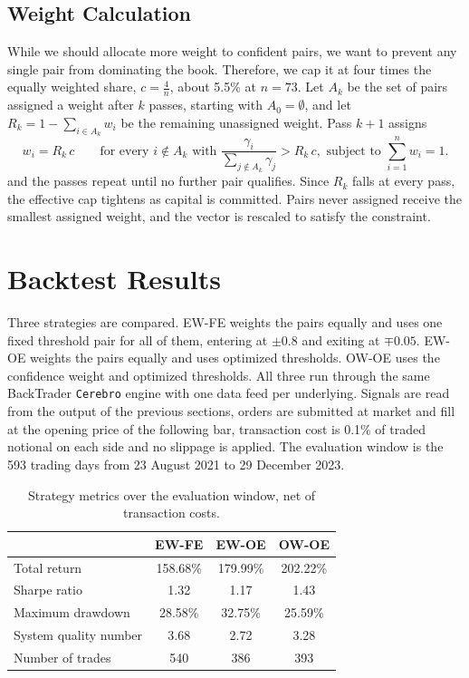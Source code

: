 \documentclass[11pt]{article}
\newcommand{\EWFE}{\mbox{EW-FE}}
\newcommand{\EWOE}{\mbox{EW-OE}}
\newcommand{\OWOE}{\mbox{OW-OE}}
\begin{document}
\subsection{Weight Calculation}

While we should allocate more weight to confident pairs, we want to prevent any single pair from dominating the book. Therefore, we cap it at four times the equally weighted share, $c = \frac{4}{n}$, about 5.5\% at $n = 73$. Let $A_k$ be the set of pairs assigned a weight after $k$ passes, starting with $A_0 = \emptyset$, and let $R_k = 1 - \sum_{i \in A_k} w_i$ be the remaining unassigned weight. Pass $k+1$ assigns
\begin{equation}
w_i = R_k\, c \qquad \text{for every } i \notin A_k \text{ with } \frac{\gamma_i}{\sum_{j \notin A_k} \gamma_j} > R_k\, c, \text{ subject to }
\sum_{i=1}^{n} w_i = 1 .
\label{eq:cap}
\end{equation}
and the passes repeat until no further pair qualifies. Since $R_k$ falls at every pass, the effective cap tightens as capital is committed. Pairs never assigned receive the smallest assigned weight, and the vector is rescaled to satisfy the constraint.

\section{Backtest Results}

Three strategies are compared. \EWFE{} weights the pairs equally and uses one fixed threshold pair for all of them, entering at $\pm 0.8$ and exiting at $\mp 0.05$. \EWOE{} weights the pairs equally and uses optimized thresholds. \OWOE{} uses the confidence weight and optimized thresholds. All three run through the same BackTrader \texttt{Cerebro} engine with one data feed per underlying. Signals are read from the output of the previous sections, orders are submitted at market and fill at the opening price of the following bar, transaction cost is 0.1\% of traded notional on each side and no slippage is applied. The evaluation window is the 593 trading days from 23 August 2021 to 29 December 2023.

\begin{table}[thbp]
\centering
\begin{tabular}{lccc}
\toprule
 & \EWFE{} & \EWOE{} & \OWOE{} \\
\midrule
Total return           & 158.68\% & 179.99\% & 202.22\% \\
Sharpe ratio           & 1.32     & 1.17     & 1.43     \\
Maximum drawdown       & 28.58\%  & 32.75\%  & 25.59\%  \\
System quality number  & 3.68     & 2.72     & 3.28     \\
Number of trades       & 540      & 386      & 393      \\
\bottomrule
\end{tabular}
\caption{Strategy metrics over the evaluation window, net of transaction costs.}
\label{tab:metrics}
\end{table}
\end{document}
